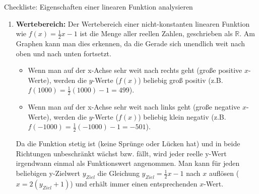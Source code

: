 \begin{loesungsumgebung}{Checkliste: Eigenschaften einer linearen Funktion analysieren}
\begin{enumerate}[label=(\alph*)]
    \item \textbf{Wertebereich:}
    Der Wertebereich einer nicht-konstanten linearen Funktion wie $f(x) = \frac{1}{2}x - 1$ ist die Menge aller reellen Zahlen, geschrieben als $\mathbb{R}$.
    Am Graphen kann man dies erkennen, da die Gerade sich unendlich weit nach oben und nach unten fortsetzt.
    \begin{itemize}
        \item Wenn man auf der x-Achse sehr weit nach rechts geht (große positive $x$-Werte), werden die $y$-Werte ($f(x)$) beliebig groß positiv (z.B. $f(1000) = \frac{1}{2}(1000)-1 = 499$).
        \item Wenn man auf der x-Achse sehr weit nach links geht (große negative $x$-Werte), werden die $y$-Werte ($f(x)$) beliebig klein negativ (z.B. $f(-1000) = \frac{1}{2}(-1000)-1 = -501$).
    \end{itemize}
    Da die Funktion stetig ist (keine Sprünge oder Lücken hat) und in beide Richtungen unbeschränkt wächst bzw. fällt, wird jeder reelle y-Wert irgendwann einmal als Funktionswert angenommen. Man kann für jeden beliebigen y-Zielwert $y_{Ziel}$ die Gleichung $y_{Ziel} = \frac{1}{2}x - 1$ nach $x$ auflösen ($x = 2(y_{Ziel}+1)$) und erhält immer einen entsprechenden $x$-Wert.
\end{enumerate}

\end{loesungsumgebung}


